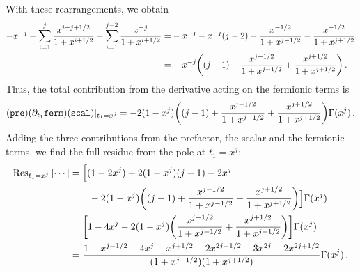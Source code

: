 \documentclass[a4paper,11pt]{article}
\begin{document}
With these rearrangements, we obtain
\begin{equation}
\begin{split}
	-x^{-j} - \sum_{i=1}^{j} \frac{x^{i-j+1/2}}{1+x^{i+1/2}} - \sum_{i=1}^{j-2} \frac{x^{-j}}{1+x^{i+1/2}}
	= &-x^{-j} - x^{-j}(j-2) - \frac{x^{-1/2}}{1+x^{j-1/2}} - \frac{x^{+1/2}}{1+x^{j+1/2}}\\
	= &-x^{-j}\qty( (j-1) + \frac{x^{j-1/2}}{1+x^{j-1/2}} + \frac{x^{j+1/2}}{1+x^{j+1/2}} )\,.
\end{split}
\end{equation}
Thus, the total contribution from the derivative acting on the fermionic terms is
\begin{equation}
	(\mathtt{pre})(\partial_{t_1}\mathtt{ferm})(\mathtt{scal})|_{t_1=x^j}=-2(1-x^j)\qty( (j-1) + \frac{x^{j-1/2}}{1+x^{j-1/2}} + \frac{x^{j+1/2}}{1+x^{j+1/2}} )  \Gamma(x^j)\,.
\end{equation}
Adding the three contributions from the prefactor, the scalar and the fermionic terms, we find the full residue from the pole at $t_1=x^j$:
\begin{equation}\label{eq:psu112_residue}
\begin{split}
	\Res_{t_1=x^j}\qty[\cdots]&=\Bigl[ (1-2x^j) + 2(1-x^j)(j-1) - 2x^j 
	\\&\qquad- 2(1-x^j)\qty( (j-1) + \frac{x^{j-1/2}}{1+x^{j-1/2}} + \frac{x^{j+1/2}}{1+x^{j+1/2}} ) \Bigr]  \Gamma(x^j)\\
	&= \qty[1-4x^j -2(1-x^j)\qty( \frac{x^{j-1/2}}{1+x^{j-1/2}} + \frac{x^{j+1/2}}{1+x^{j+1/2}} )]  \Gamma(x^j)\\
	&= \frac{1-x^{j-1/2}-4x^j-x^{j+1/2}-2x^{2j-1/2}-3x^{2j}-2x^{2j+1/2}}{(1+x^{j-1/2})(1+x^{j+1/2})}  \Gamma(x^j)\,.
\end{split}
\end{equation}
\end{document}
